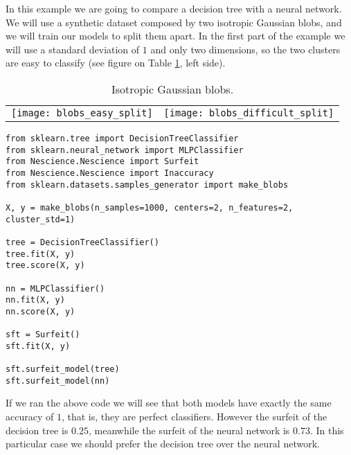 \begin{example}
\label{ex:dt_vs_nn}

In this example we are going to compare a decision tree with a neural network. We will use a synthetic dataset composed by two isotropic Gaussian blobs, and we will train our models to split them apart. In the first part of the example we will use a standard deviation of $1$ and only two dimensions, so the two clusters are easy to classify (see figure on Table \ref{tab:isotropic_gaussian_blobs}, left side).

\begin{table}
\begin{center}

\begin{tabular}{ c c }

\texttt{[image: blobs\_easy\_split]} & \texttt{[image: blobs\_difficult\_split]}

\end{tabular}
\end{center}
\caption{\label{tab:isotropic_gaussian_blobs}Isotropic Gaussian blobs.}
\end{table}


\begin{sourcecode}
{\scriptsize \begin{verbatim}
from sklearn.tree import DecisionTreeClassifier
from sklearn.neural_network import MLPClassifier
from Nescience.Nescience import Surfeit
from Nescience.Nescience import Inaccuracy
from sklearn.datasets.samples_generator import make_blobs

X, y = make_blobs(n_samples=1000, centers=2, n_features=2, cluster_std=1)

tree = DecisionTreeClassifier()
tree.fit(X, y)
tree.score(X, y)

nn = MLPClassifier()
nn.fit(X, y)
nn.score(X, y)

sft = Surfeit()
sft.fit(X, y)

sft.surfeit_model(tree)
sft.surfeit_model(nn)

\end{verbatim}}
\end{sourcecode}

If we ran the above code we will see that both models have exactly the same accuracy of $1$, that is, they are perfect classifiers. However the surfeit of the decision tree is $0.25$, meanwhile the surfeit of the neural network is $0.73$. In this particular case we should prefer the decision tree over the neural network.


\end{example}
